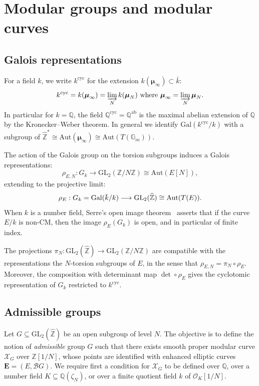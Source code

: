 \documentclass{amsart}
\newcommand{\cB}{\mathcal{B}}
\newcommand{\cO}{\mathcal{O}}
\newcommand{\EE}{\mathbf{E}}
\newcommand{\GG}{\mathbb{G}}
\newcommand{\QQ}{\mathbb{Q}}
\newcommand{\ZZ}{\mathbb{Z}}
\newcommand{\ZZhat}{\widehat{\ZZ}}
\newcommand{\XC}{\mathcal{X}}
\newcommand{\GL}{\mathrm{GL}}
\newcommand{\Aut}{\mathrm{Aut}}
\newcommand{\isom}{\cong}
\newcommand{\overbar}[1]{\mkern 2.0mu\overline{\mkern-2.0mu#1\mkern-2.0mu}\mkern 2.0mu}
\newcommand{\kbar}{\overbar{\smash{k}\vphantom{t}}}
\newcommand{\Group}{G}
\newcommand{\Gal}{\mathrm{Gal}}
\newcommand{\mmu}{\boldsymbol{\mu}}
\newcommand{\ab}{\mathrm{ab}}
\newcommand{\cyc}{\mathrm{cyc}}
\begin{document}
\section*{Modular groups and modular curves}


\subsection*{Galois representations}
For a field $k$, we write $k^{\cyc}$ for the extension $k(\mmu_\infty) \subset \bar{k}$:
$$
k^{\cyc} = k(\mmu_\infty) = \varinjlim_N k(\mmu_N) \mbox{ where } \mmu_\infty = \varinjlim_N \mmu_N.
$$
In particular for $k = \QQ$, the field $\QQ^{\cyc} = \QQ^{\ab}$ is the maximal
abelian extension of $\QQ$ by the Kronecker--Weber theorem.
In general we identify $\Gal(k^\cyc/k)$ with a subgroup of $\ZZhat^* \isom \Aut(\mmu_\infty)
\isom \Aut(T(\GG_m))$.

The action of the Galois group on the torsion subgroups induces a Galois representations:
$$
\rho_{E,N}: G_k \longrightarrow \GL_2(\ZZ/N\ZZ) \isom \Aut(E[N]),
$$
extending to the projective limit:
$$
\rho_E: G_k = \Gal(\kbar/k) \longrightarrow \GL_2(\ZZhat) \isom \Aut(T(E)).
$$
When $k$ is a number field, Serre's open image theorem~\cite{Serre72} asserts that if
the curve $E/k$ is non-CM, then the image $\rho_E(G_k)$ is open, and in particular of
finite index.

The projections $\pi_N:\GL_2(\ZZhat) \longrightarrow \GL_2(\ZZ/N\ZZ)$
are compatible with the representations the $N$-torsion subgroups of $E$,
in the sense that $\rho_{E,N} = \pi_N \circ \rho_E$.
Moreover, the composition with determinant map $\det \circ \rho_E$ gives
the cyclotomic representation of $G_k$ restricted to $k^\cyc$. %

\subsection*{Admissible groups}
Let $G \subseteq \GL_2(\ZZhat)$ be an open subgroup of level $N$.  The objective
is to define the notion of {\it admissible} group $G$ such that there exists
smooth proper modular curve $\XC_G$ over $\ZZ[1/N]$, whose points are identified
with enhanced elliptic curves $\EE = (E,\cB\Group)$.  We require first a condition
for $\XC_G$ to be defined over $\QQ$, over a number field $K \subseteq \QQ(\zeta_N)$,
or over a finite quotient field $k$ of $\cO_K[1/N]$.
\end{document}
